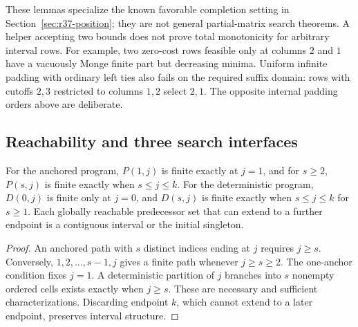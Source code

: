 These lemmas specialize the known favorable completion setting in Section~\ref{sec:r37-position}; they are not general partial-matrix search theorems. A helper accepting two bounds does not prove total monotonicity for arbitrary interval rows. For example, two zero-cost rows feasible only at columns $2$ and $1$ have a vacuously Monge finite part but decreasing minima. Uniform infinite padding with ordinary left ties also fails on the required suffix domain: rows with cutoffs $2,3$ restricted to columns $1,2$ select $2,1$. The opposite internal padding orders above are deliberate.

\subsection{Reachability and three search interfaces}
\begin{lemma}\label{lem:r37-reach}
For the anchored program, $P(1,j)$ is finite exactly at $j=1$, and for $s\geq2$, $P(s,j)$ is finite exactly when $s\leq j\leq k$. For the deterministic program, $D(0,j)$ is finite only at $j=0$, and $D(s,j)$ is finite exactly when $s\leq j\leq k$ for $s\geq1$. Each globally reachable predecessor set that can extend to a further endpoint is a contiguous interval or the initial singleton.
\end{lemma}
\begin{proof}
An anchored path with $s$ distinct indices ending at $j$ requires $j\geq s$. Conversely, $1,2,\ldots,s-1,j$ gives a finite path whenever $j\geq s\geq2$. The one-anchor condition fixes $j=1$. A deterministic partition of $j$ branches into $s$ nonempty ordered cells exists exactly when $j\geq s$. These are necessary and sufficient characterizations. Discarding endpoint $k$, which cannot extend to a later endpoint, preserves interval structure.
\end{proof}

